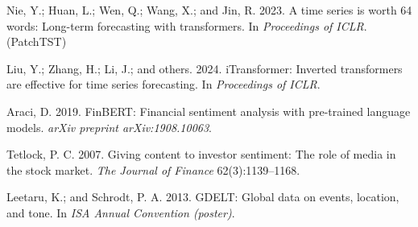 \documentclass[12pt,a4paper,oneside]{report}
\begin{document}
\begin{thebibliography}{}
Nie, Y.; Huan, L.; Wen, Q.; Wang, X.; and Jin, R. 2023.
A time series is worth 64 words: Long-term forecasting with transformers.
In \textit{Proceedings of ICLR}. (PatchTST)

Liu, Y.; Zhang, H.; Li, J.; and others. 2024.
iTransformer: Inverted transformers are effective for time series forecasting.
In \textit{Proceedings of ICLR}.

Araci, D. 2019.
FinBERT: Financial sentiment analysis with pre-trained language models.
\textit{arXiv preprint arXiv:1908.10063}.

Tetlock, P. C. 2007.
Giving content to investor sentiment: The role of media in the stock market.
\textit{The Journal of Finance} 62(3):1139--1168.

Leetaru, K.; and Schrodt, P. A. 2013.
GDELT: Global data on events, location, and tone.
In \textit{ISA Annual Convention (poster)}.
\end{thebibliography}
\end{document}
